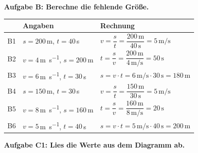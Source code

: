 \documentclass[11pt,a4paper]{article}
\newcommand{\aufgabe}[1]{\noindent\textbf{\textcolor{fachfarbe}{#1}}}
\newcommand{\lsg}[1]{\textcolor{loesung}{\textbf{#1}}}
\begin{document}
\vspace{0.4em}

\aufgabe{Aufgabe B: Berechne die fehlende Größe.}

\vspace{0.3em}
{\small
\begin{tabular}{|c|p{6cm}|p{8cm}|}
\hline
& \textbf{Angaben} & \textbf{Rechnung} \\
\hline
B1 & $s = 200$\,m, $t = 40$\,s & \lsg{$v = \dfrac{s}{t} = \dfrac{200\,\text{m}}{40\,\text{s}} = 5\,\si{\metre\per\second}$} \\[0.6cm]
\hline
B2 & $v = 4$\,\si{\metre\per\second}, $s = 200$\,m & \lsg{$t = \dfrac{s}{v} = \dfrac{200\,\text{m}}{4\,\si{\metre\per\second}} = 50\,\text{s}$} \\[0.6cm]
\hline
B3 & $v = 6$\,\si{\metre\per\second}, $t = 30$\,s & \lsg{$s = v \cdot t = 6\,\si{\metre\per\second} \cdot 30\,\text{s} = 180\,\text{m}$} \\[0.6cm]
\hline
B4 & $s = 150$\,m, $t = 30$\,s & \lsg{$v = \dfrac{s}{t} = \dfrac{150\,\text{m}}{30\,\text{s}} = 5\,\si{\metre\per\second}$} \\[0.6cm]
\hline
B5 & $v = 8$\,\si{\metre\per\second}, $s = 160$\,m & \lsg{$t = \dfrac{s}{v} = \dfrac{160\,\text{m}}{8\,\si{\metre\per\second}} = 20\,\text{s}$} \\[0.6cm]
\hline
B6 & $v = 5$\,\si{\metre\per\second}, $t = 40$\,s & \lsg{$s = v \cdot t = 5\,\si{\metre\per\second} \cdot 40\,\text{s} = 200\,\text{m}$} \\[0.6cm]
\hline
\end{tabular}
}

\vspace{0.6em}

\aufgabe{Aufgabe C1: Lies die Werte aus dem Diagramm ab.}
\end{document}
